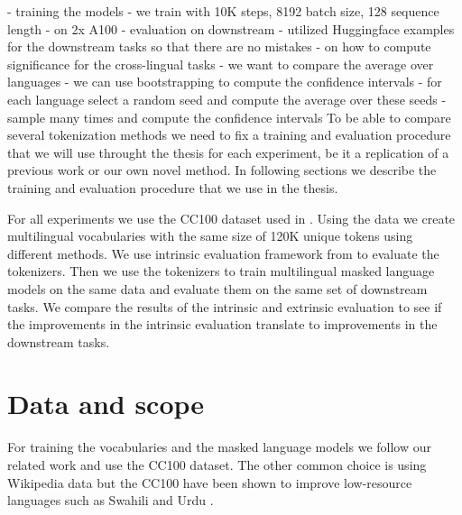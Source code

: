 - training the models
    - we train with 10K steps, 8192 batch size, 128 sequence length
    - on 2x A100
- evaluation on downstream
    - utilized Huggingface examples for the downstream tasks so that there are no mistakes
    - on how to compute significance for the cross-lingual tasks
        - we want to compare the average over languages
        - we can use bootstrapping to compute the confidence intervals
            - for each language select a random seed and compute the average over these seeds
            - sample many times and compute the confidence intervals
To be able to compare several tokenization methods we need to fix a training and evaluation procedure that we will use throught the thesis for each experiment, be it a replication of a previous work or our own novel method. In following sections we describe the training and evaluation procedure that we use in the thesis.

For all experiments we use the CC100 dataset used in \citet{conneau_unsupervised_2020}. Using the data we create multilingual vocabularies with the same size of 120K unique tokens using different methods. We use intrinsic evaluation framework from \citet{limisiewicz_tokenization_2023} to evaluate the tokenizers. Then we use the tokenizers to train multilingual masked language models on the same data and evaluate them on the same set of downstream tasks. We compare the results of the intrinsic and extrinsic evaluation to see if the improvements in the intrinsic evaluation translate to improvements in the downstream tasks.

\section{Data and scope}


For training the vocabularies and the masked language models we follow our related work \cite{conneau_unsupervised_2020,chung_improving_2020,liang_xlm-v_2023} and use the CC100 dataset. The other common choice is using Wikipedia data \cite{devlin_bert_2019,zheng_allocating_2021} but the CC100 have been shown to improve low-resource languages such as Swahili and Urdu \cite{conneau_unsupervised_2020}.

